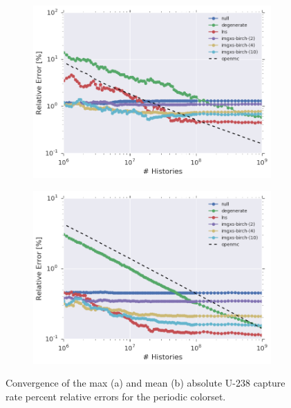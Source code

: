 \begin{figure}[h!]
\centering
\begin{subfigure}{\textwidth}
  \centering
  \includegraphics[width=0.9\linewidth]{figures/results/convergence/2x2/max-capt-err-evo}
  \caption{}
  \label{fig:chap11-2x2-capture-converge-max}
\end{subfigure}
\begin{subfigure}{\textwidth}
  \centering
  \includegraphics[width=0.9\linewidth]{figures/results/convergence/2x2/mean-capt-err-evo}
  \caption{}
  \label{fig:chap11-2x2-capture-converge-mean}
\end{subfigure}
\vspace{2mm}
\caption[U-238 capture rate error convergence with MC histories]{Convergence of the max (a) and mean (b) absolute U-238 capture rate percent relative errors for the periodic colorset.}
\label{fig:chap11-2x2-capture-converge}
\end{figure}

